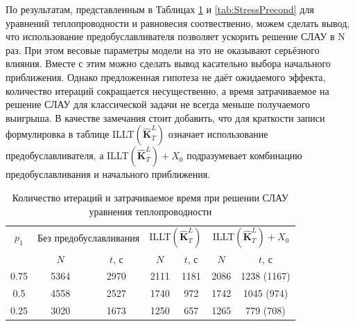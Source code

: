 По результатам, представленным в Таблицах \ref{tab:ThermalPrecond} и \ref{tab:StressPrecond} для уравнений теплопроводности и равновесия соотвественно, можем сделать вывод, что использование предобуславливателя позволяет ускорить решение СЛАУ в N раз. При этом весовые параметры модели на это не оказывают серьёзного влияния. Вместе с этим можно сделать вывод касательно выбора начального приближения. Однако предложенная гипотеза не даёт ожидаемого эффекта, количество итераций сокращается несущественно, а время затрачиваемое на решение СЛАУ для классической задачи не всегда меньше получаемого выигрыша. В качестве замечания стоит добавить, что для краткости записи формулировка в таблице ILLT$\left( \widehat{\textbf{K}}^L_T \right)$ означает использование предобуславливателя, а ILLT$\left( \widehat{\textbf{K}}^L_T \right) + X_0$ подразумевает комбинацию предобуславливания и начального приближения.

\begin{table}[htbp]
    \centering
    \begin{threeparttable}%
        \caption{Количество итераций и затрачиваемое время при решении СЛАУ уравнения теплопроводности}\label{tab:ThermalPrecond}
        \begin{tabular}{|c|c|c|c|c|c|c|}
		\hline
		$p_1$ & \multicolumn{2}{c|}{Без предобуславливания} & \multicolumn{2}{c|}{ILLT$\left( \widehat{\textbf{K}}^L_T \right)$} & \multicolumn{2}{c|}{ILLT$\left( \widehat{\textbf{K}}^L_T \right) + X_0$}\\
		\cline{2-7}
		     & $N$ & $t$, с & $N$ & $t$, с & $N$ & $t$, с \\
		\hline
		0.75 & 5364 & 2970 & 2111 & 1181 & 2086 & 1238 (1167) \\
		\hline
		0.5  & 4558 & 2527 & 1740 & 972 & 1742 & 1045 (974) \\
		\hline
		0.25 & 3020 & 1673 & 1250 & 657 & 1265 & 779 (708) \\
		\hline
        \end{tabular}
    \end{threeparttable}
\end{table}

